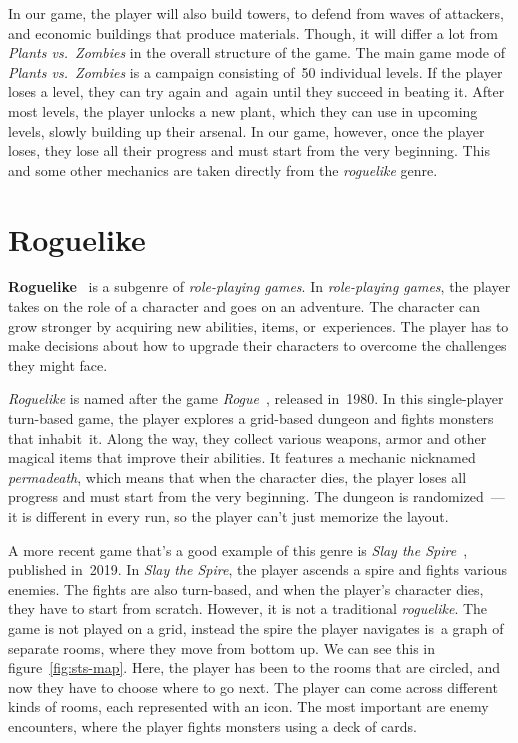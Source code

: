 In our game, the player will also build towers, to defend from waves of attackers, and economic buildings that produce materials.
Though, it will differ a lot from \emph{Plants vs.\ Zombies} in the overall structure of the game.
The main game mode of \emph{Plants vs.\ Zombies} is a campaign consisting of~50 individual levels.
If the player loses a level, they can try again and~again until they succeed in beating it.
After most levels, the player unlocks a new plant, which they can use in upcoming levels, slowly building up their arsenal.
In our game, however, once the player loses, they lose all their progress and must start from the very beginning.
This and some other mechanics are taken directly from the \emph{roguelike} genre.

\section{Roguelike}

\textbf{Roguelike}~\cite{RoguelikeWiki} is a subgenre of \emph{role-playing games}.
In \emph{role-playing games}, the player takes on the role of a character and goes on an adventure.
The character can grow stronger by acquiring new abilities, items, or~experiences.
The player has to make decisions about how to upgrade their characters to overcome the challenges they might face.

\emph{Roguelike} is named after the game \emph{Rogue}~\cite{RogueWiki}, released in~1980.
In this single-player turn-based game, the player explores a grid-based dungeon and fights monsters that inhabit~it.
Along the way, they collect various weapons, armor and other magical items that improve their abilities.
It features a mechanic nicknamed \emph{permadeath}, which means that when the character dies, the player loses all progress and must start from the very beginning.
The dungeon is randomized~--- it is different in every run, so the player can't just memorize the layout.

A more recent game that's a good example of this genre is \emph{Slay the Spire}~\cite{StSWiki}, published in~2019.
In \emph{Slay the Spire}, the player ascends a spire and fights various enemies.
The fights are also turn-based, and when the player's character dies, they have to start from scratch.
However, it is not a traditional \emph{roguelike}.
The game is not played on a grid, instead the spire the player navigates is~a graph of separate rooms, where they move from bottom up.
We can see this in figure~\ref{fig:sts-map}.
Here, the player has been to the rooms that are circled, and now they have to choose where to go next.
The player can come across different kinds of rooms, each represented with an icon.
The most important are enemy encounters, where the player fights monsters using a deck of cards.

